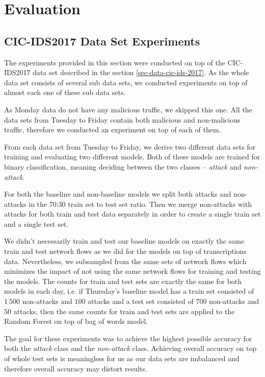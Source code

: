 \documentclass{article}
\begin{document}
\section{Evaluation}

\subsection{CIC-IDS2017 Data Set Experiments}\label{sec-cic-ids-experiments}

The experiments provided in this section were conducted on top of the CIC-IDS2017 data set described in the section \ref{sec-data-cic-ids-2017}. As the whole data set consists of several sub data sets, we conducted experiments on top of almost each one of these sub data sets.

As Monday data do not have any malicious traffic, we skipped this one. All the data sets from Tuesday to Friday contain both malicious and non-malicious traffic, therefore we conducted an experiment on top of each of them.

From each data set from Tuesday to Friday, we derive two different data sets for training and evaluating two different models. Both of these models are trained for binary classification, meaning deciding between the two classes -- \textit{attack} and \textit{non-attack}.

For both the baseline and non-baseline models we split both attacks and non-attacks in the 70:30 train set to test set ratio. Then we merge non-attacks with attacks for both train and test data separately in order to create a single train set and a single test set.

We didn't necessarily train and test our baseline models on exactly the same train and test network flows as we did for the models on top of transcriptions data. Nevertheless, we subsampled from the same sets of network flows which minimizes the impact of not using the same network flows for training and testing the models. The counts for train and test sets are exactly the same for both models in each day, i.e. if Thursday's baseline model has a train set consisted of $1\ 500$ non-attacks and $100$ attacks and a test set consisted of $700$ non-attacks and $50$ attacks, then the same counts for train and test sets are applied to the Random Forest on top of bag of words model.

The goal for these experiments was to achieve the highest possible accuracy for both the \textit{attack} class and the \textit{non-attack} class. Achieving overall accuracy on top of whole test sets is meaningless for us as our data sets are imbalanced and therefore overall accuracy may distort results.\\
\end{document}
